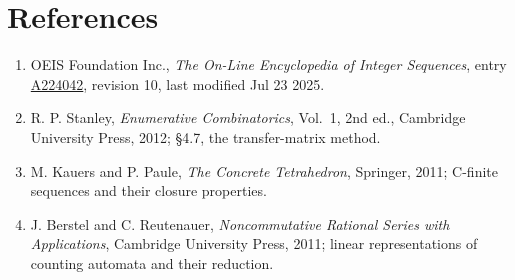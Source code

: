 \documentclass[11pt]{article}
\theoremstyle{definition}
\begin{document}
\section{References}

\begin{enumerate}

\item OEIS Foundation Inc., \emph{The On-Line Encyclopedia of Integer Sequences}, entry \href{https://oeis.org/A224042}{A224042}, revision 10, last modified Jul 23 2025.

\item R. P. Stanley, \emph{Enumerative Combinatorics}, Vol.~1, 2nd ed., Cambridge University Press, 2012; \S4.7, the transfer-matrix method.

\item M. Kauers and P. Paule, \emph{The Concrete Tetrahedron}, Springer, 2011; C-finite sequences and their closure properties.

\item J. Berstel and C. Reutenauer, \emph{Noncommutative Rational Series with Applications}, Cambridge University Press, 2011; linear representations of counting automata and their reduction.

\end{enumerate}
\end{document}
